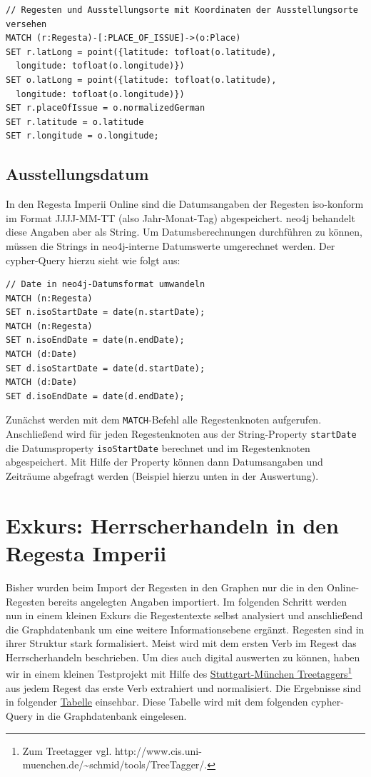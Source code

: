\documentclass[ngerman,]{scrreprt}
\begin{document}
\begin{verbatim}
// Regesten und Ausstellungsorte mit Koordinaten der Ausstellungsorte versehen
MATCH (r:Regesta)-[:PLACE_OF_ISSUE]->(o:Place)
SET r.latLong = point({latitude: tofloat(o.latitude),
  longitude: tofloat(o.longitude)})
SET o.latLong = point({latitude: tofloat(o.latitude),
  longitude: tofloat(o.longitude)})
SET r.placeOfIssue = o.normalizedGerman
SET r.latitude = o.latitude
SET r.longitude = o.longitude;
\end{verbatim}

\subsection{Ausstellungsdatum}\label{ausstellungsdatum}

In den Regesta Imperii Online sind die Datumsangaben der Regesten iso-konform im Format JJJJ-MM-TT (also Jahr-Monat-Tag) abgespeichert. neo4j behandelt diese Angaben aber als String. Um Datumsberechnungen durchführen zu können, müssen die Strings in neo4j-interne Datumswerte umgerechnet werden. Der cypher-Query hierzu sieht wie folgt aus:

\begin{verbatim}
// Date in neo4j-Datumsformat umwandeln
MATCH (n:Regesta)
SET n.isoStartDate = date(n.startDate);
MATCH (n:Regesta)
SET n.isoEndDate = date(n.endDate);
MATCH (d:Date)
SET d.isoStartDate = date(d.startDate);
MATCH (d:Date)
SET d.isoEndDate = date(d.endDate);
\end{verbatim}

Zunächst werden mit dem \texttt{MATCH}-Befehl alle Regestenknoten aufgerufen. Anschließend wird für jeden Regestenknoten aus der String-Property \texttt{startDate} die Datumsproperty \texttt{isoStartDate} berechnet und im Regestenknoten abgespeichert. Mit Hilfe der Property können dann Datumsangaben und Zeiträume abgefragt werden (Beispiel hierzu unten in der Auswertung).

\section{Exkurs: Herrscherhandeln in den Regesta Imperii}\label{exkurs-herrscherhandeln-in-den-regesta-imperii}

Bisher wurden beim Import der Regesten in den Graphen nur die in den Online-Regesten bereits angelegten Angaben importiert. Im folgenden Schritt werden nun in einem kleinen Exkurs die Regestentexte selbst analysiert und anschließend die Graphdatenbank um eine weitere Informationsebene ergänzt. Regesten sind in ihrer Struktur stark formalisiert. Meist wird mit dem ersten Verb im Regest das Herrscherhandeln beschrieben. Um dies auch digital auswerten zu können, haben wir in einem kleinen Testprojekt mit Hilfe des \href{http://www.cis.uni-muenchen.de/~schmid/tools/TreeTagger/}{Stuttgart-München Treetaggers}\footnote{Zum Treetagger vgl. http://www.cis.uni-muenchen.de/\textasciitilde{}schmid/tools/TreeTagger/.} aus jedem Regest das erste Verb extrahiert und normalisiert. Die Ergebnisse sind in folgender \href{https://docs.google.com/spreadsheets/d/1nlbZmQYcT1E3Z58yPmcnulcNQc1e3111Di-4huhV-FY/edit?usp=sharing}{Tabelle} einsehbar. Diese Tabelle wird mit dem folgenden cypher-Query in die Graphdatenbank eingelesen.
\end{document}
